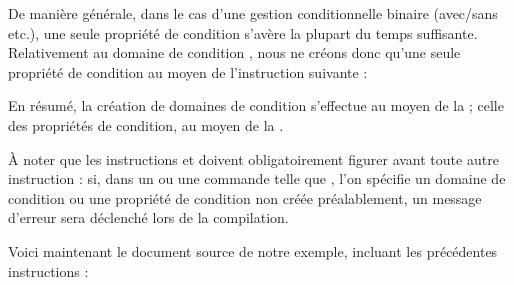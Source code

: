 \documentclass{article}
\begin{document}
De manière générale, dans le cas d'une gestion conditionnelle binaire (avec/sans etc.), une seule propriété de condition s'avère la plupart du temps suffisante. Relativement au domaine de condition , nous ne créons donc qu'une seule propriété de condition au moyen de l'instruction suivante :

\begin{codeblock}
\end{codeblock}

En résumé, la création de domaines de condition s'effectue au moyen de la  ; celle des propriétés de condition, au moyen de la .

À noter que les instructions  et  doivent obligatoirement figurer avant toute autre instruction : si, dans un  ou une commande telle que , l'on spécifie un domaine de condition ou une propriété de condition non créée préalablement, un message d'erreur sera déclenché lors de la compilation.

\tutostep
Voici maintenant le document source de notre exemple, incluant les précédentes instructions :
\end{document}
